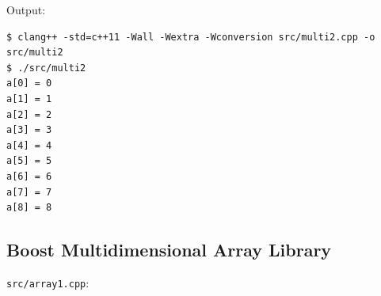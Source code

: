 \documentclass[12pt,letterpaper,twoside]{article}
\begin{document}
Output:

\begin{verbatim}
$ clang++ -std=c++11 -Wall -Wextra -Wconversion src/multi2.cpp -o src/multi2
$ ./src/multi2
a[0] = 0
a[1] = 1
a[2] = 2
a[3] = 3
a[4] = 4
a[5] = 5
a[6] = 6
a[7] = 7
a[8] = 8
\end{verbatim}

\hypertarget{boost-multidimensional-array-library}{%
\subsection{Boost Multidimensional Array
Library}\label{boost-multidimensional-array-library}}

\texttt{src/array1.cpp}:

\begin{Shaded}
\begin{Highlighting}[]

   \NormalTok{;}
  \NormalTok{, }

  \NormalTok{;}
  \NormalTok{ (} 
    \NormalTok{ (} 
\NormalTok{    \}}
\NormalTok{  \}}

  \NormalTok{ (} 
    \NormalTok{ (} 
      \StringTok{"a["}\StringTok{"]["}\StringTok{"] = "}
\NormalTok{    \}}
\NormalTok{  \}}
   \NormalTok{;}
\NormalTok{\}}
\end{Highlighting}
\end{Shaded}
\end{document}
